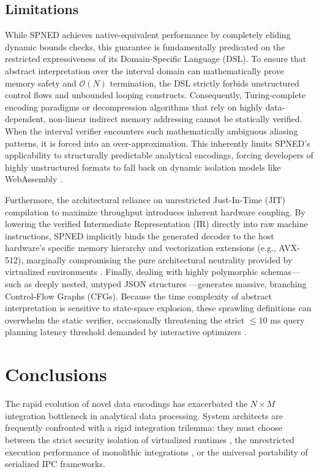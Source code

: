 \documentclass[onecolumn]{IEEEtran}
\numberwithin{equation}{section}
\theoremstyle{definition}
\theoremstyle{remark}
\begin{document}
\subsection{Limitations}

While SPNED achieves native-equivalent performance by completely eliding dynamic bounds checks, this guarantee is fundamentally predicated on the restricted expressiveness of its Domain-Specific Language (DSL). To ensure that abstract interpretation over the interval domain can mathematically prove memory safety and $\mathcal{O}(N)$ termination, the DSL strictly forbids unstructured control flows and unbounded looping constructs. Consequently, Turing-complete encoding paradigms or decompression algorithms that rely on highly data-dependent, non-linear indirect memory addressing cannot be statically verified. When the interval verifier encounters such mathematically ambiguous aliasing patterns, it is forced into an over-approximation. This inherently limits SPNED's applicability to structurally predictable analytical encodings, forcing developers of highly unstructured formats to fall back on dynamic isolation models like WebAssembly \cite{gienieczko2025anyblox, watt2018mechanising}.

Furthermore, the architectural reliance on unrestricted Just-In-Time (JIT) compilation to maximize throughput introduces inherent hardware coupling. By lowering the verified Intermediate Representation (IR) directly into raw machine instructions, SPNED implicitly binds the generated decoder to the host hardware's specific memory hierarchy and vectorization extensions (e.g., AVX-512), marginally compromising the pure architectural neutrality provided by virtualized environments \cite{haas2017bringing}. Finally, dealing with highly polymorphic schemas—such as deeply nested, untyped JSON structures \cite{ecma1997json}—generates massive, branching Control-Flow Graphs (CFGs). Because the time complexity of abstract interpretation is sensitive to state-space explosion, these sprawling definitions can overwhelm the static verifier, occasionally threatening the strict $\le 10\text{ ms}$ query planning latency threshold demanded by interactive optimizers \cite{anneser2023autosteer}.

\section{Conclusions}

The rapid evolution of novel data encodings has exacerbated the $N \times M$ integration bottleneck in analytical data processing. System architects are frequently confronted with a rigid integration trilemma: they must choose between the strict security isolation of virtualized runtimes \cite{gienieczko2025anyblox}, the unrestricted execution performance of monolithic integrations \cite{duckdb2025duckdb}, or the universal portability of serialized IPC frameworks. 
\end{document}
